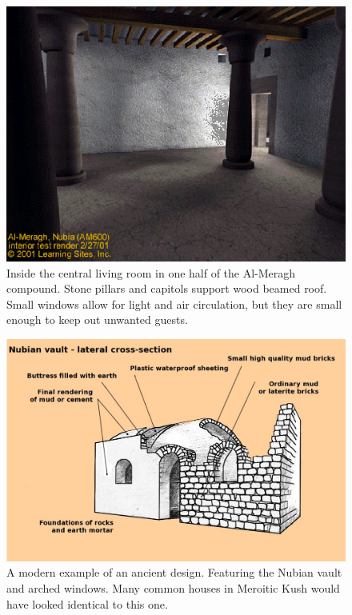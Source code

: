 \documentclass[a4paper,12pt]{scrreprt}
\begin{document}
\begin{figure}[H]
	\centering
	\includegraphics[width=\textwidth]{img/house/double_house_inside}
	\caption{Inside the central living room in one half of the Al-Meragh compound. Stone pillars and capitols support wood beamed roof. Small windows allow for light and air circulation, but they are small enough to keep out unwanted guests.}
\end{figure}

\begin{figure}[H]
	\centering
	\includegraphics[width=\textwidth]{img/house/nubian_vault_sketch}
	\caption{A modern example of an ancient design. Featuring the Nubian vault and arched windows. Many common houses in Meroitic Kush would have looked identical to this one.}
\end{figure}
\end{document}

